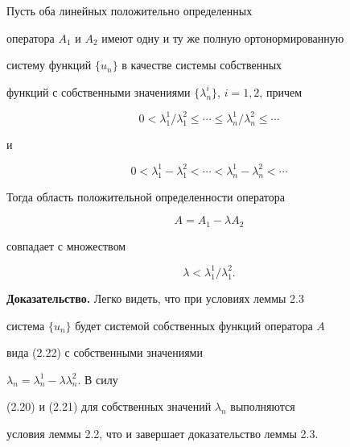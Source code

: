 \begin{lems} Пусть оба линейных положительно определенных 


оператора $A_1$ и $A_2$ имеют одну и ту же полную ортонормированную 


систему функций $\{u_n\}$ в качестве системы собственных 


функций с собственными значениями $\{\lambda^i_n\}$, $i=1,2$, причем 


\begin{equation} 


0<\lambda^1_1/\lambda^2_1\le\dotsb\le\lambda^1_n/\lambda^2_n\le\dotsb 


\end{equation} 


и 


\begin{equation} 


0<\lambda^1_1-\lambda^2_1<\dotsb<\lambda^1_n-\lambda^2_n<\dotsb 


\end{equation} 


 


Тогда область положительной определенности оператора 


\begin{equation}  


A=A_1-\lambda A_2 


\end{equation}  


совпадает с множеством 


$$ 


\lambda<\lambda^1_1/\lambda^2_1. 


$$ 


\end{lems} 


 


{\bf Доказательство.} Легко видеть, что при условиях леммы 2.3 


система $\{u_n\}$ будет системой собственных функций оператора $A$ 


вида (2.22) с собственными значениями 


$\lambda_n=\lambda^1_n-\lambda\lambda^2_n$. В силу 


(2.20) и (2.21) для собственных значений $\lambda_n$ выполняются 


условия леммы 2.2, что и завершает доказательство леммы 2.3. 


